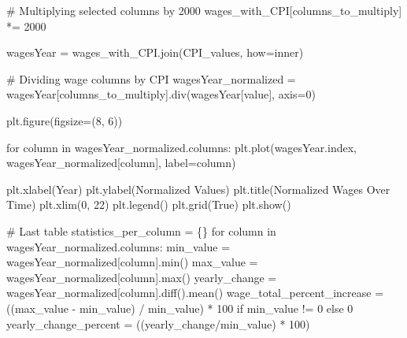 \documentclass[
  letterpaper,
  DIV=11,
  numbers=noendperiod]{scrartcl}
\newenvironment{Shaded}{\begin{snugshade}}{\end{snugshade}}
\newcommand{\BuiltInTok}[1]{\textcolor[rgb]{0.00,0.23,0.31}{#1}}
\newcommand{\CommentTok}[1]{\textcolor[rgb]{0.37,0.37,0.37}{#1}}
\newcommand{\ControlFlowTok}[1]{\textcolor[rgb]{0.00,0.23,0.31}{#1}}
\newcommand{\DecValTok}[1]{\textcolor[rgb]{0.68,0.00,0.00}{#1}}
\newcommand{\KeywordTok}[1]{\textcolor[rgb]{0.00,0.23,0.31}{#1}}
\newcommand{\NormalTok}[1]{\textcolor[rgb]{0.00,0.23,0.31}{#1}}
\newcommand{\OperatorTok}[1]{\textcolor[rgb]{0.37,0.37,0.37}{#1}}
\newcommand{\StringTok}[1]{\textcolor[rgb]{0.13,0.47,0.30}{#1}}
\newcommand{\VariableTok}[1]{\textcolor[rgb]{0.07,0.07,0.07}{#1}}
\begin{document}
\begin{Shaded}
\begin{Highlighting}[]
\CommentTok{\# Multiplying selected columns by 2000}
\NormalTok{wages\_with\_CPI[columns\_to\_multiply] }\OperatorTok{*=} \DecValTok{2000}

\NormalTok{wagesYear }\OperatorTok{=}\NormalTok{ wages\_with\_CPI.join(CPI\_values, how}\OperatorTok{=}\StringTok{\textquotesingle{}inner\textquotesingle{}}\NormalTok{)}

\CommentTok{\# Dividing wage columns by \textquotesingle{}CPI\textquotesingle{}}
\NormalTok{wagesYear\_normalized }\OperatorTok{=}\NormalTok{ wagesYear[columns\_to\_multiply].div(wagesYear[}\StringTok{\textquotesingle{}value\textquotesingle{}}\NormalTok{], axis}\OperatorTok{=}\DecValTok{0}\NormalTok{)}

\NormalTok{plt.figure(figsize}\OperatorTok{=}\NormalTok{(}\DecValTok{8}\NormalTok{, }\DecValTok{6}\NormalTok{))}

\ControlFlowTok{for}\NormalTok{ column }\KeywordTok{in}\NormalTok{ wagesYear\_normalized.columns:}
\NormalTok{    plt.plot(wagesYear.index, wagesYear\_normalized[column], label}\OperatorTok{=}\NormalTok{column)}

\NormalTok{plt.xlabel(}\StringTok{\textquotesingle{}Year\textquotesingle{}}\NormalTok{)}
\NormalTok{plt.ylabel(}\StringTok{\textquotesingle{}Normalized Values\textquotesingle{}}\NormalTok{)}
\NormalTok{plt.title(}\StringTok{\textquotesingle{}Normalized Wages Over Time\textquotesingle{}}\NormalTok{)}
\NormalTok{plt.xlim(}\DecValTok{0}\NormalTok{, }\DecValTok{22}\NormalTok{)}
\NormalTok{plt.legend()}
\NormalTok{plt.grid(}\VariableTok{True}\NormalTok{)}
\NormalTok{plt.show()}

\CommentTok{\# Last table}
\NormalTok{statistics\_per\_column }\OperatorTok{=}\NormalTok{ \{\}}
\ControlFlowTok{for}\NormalTok{ column }\KeywordTok{in}\NormalTok{ wagesYear\_normalized.columns:}
\NormalTok{    min\_value }\OperatorTok{=}\NormalTok{ wagesYear\_normalized[column].}\BuiltInTok{min}\NormalTok{()}
\NormalTok{    max\_value }\OperatorTok{=}\NormalTok{ wagesYear\_normalized[column].}\BuiltInTok{max}\NormalTok{()}
\NormalTok{    yearly\_change }\OperatorTok{=}\NormalTok{ wagesYear\_normalized[column].diff().mean()}
\NormalTok{    wage\_total\_percent\_increase }\OperatorTok{=}\NormalTok{ ((max\_value }\OperatorTok{{-}}\NormalTok{ min\_value) }\OperatorTok{/}\NormalTok{ min\_value) }\OperatorTok{*} \DecValTok{100} \ControlFlowTok{if}\NormalTok{ min\_value }\OperatorTok{!=} \DecValTok{0} \ControlFlowTok{else} \DecValTok{0}
\NormalTok{    yearly\_change\_percent }\OperatorTok{=}\NormalTok{ ((yearly\_change}\OperatorTok{/}\NormalTok{min\_value) }\OperatorTok{*} \DecValTok{100}\NormalTok{)}


\end{Highlighting}
\end{Shaded}
\end{document}
